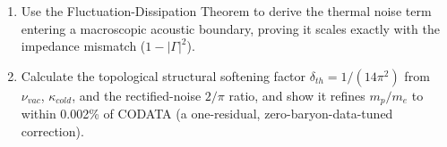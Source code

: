 \begin{exercisebox}
\begin{enumerate}
    \item Use the Fluctuation-Dissipation Theorem to derive the thermal noise term entering a macroscopic acoustic boundary, proving it scales exactly with the impedance mismatch ($1 - |\Gamma|^2$).
    \item Calculate the topological structural softening factor $\delta_{th} = 1/(14\pi^2)$ from $\nu_{vac}$, $\kappa_{cold}$, and the rectified-noise $2/\pi$ ratio, and show it refines $m_p/m_e$ to within 0.002\% of CODATA (a one-residual, zero-baryon-data-tuned correction).
\end{enumerate}
\end{exercisebox}
